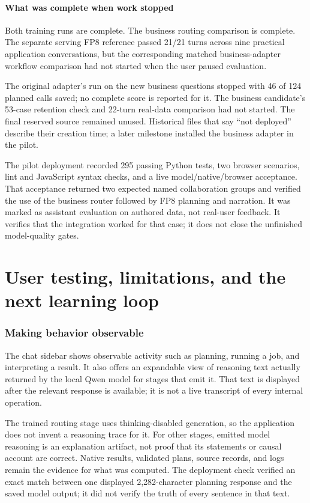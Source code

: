 \documentclass[11pt,a4paper]{article}
\begin{document}
\subsection{What was complete when work stopped}

Both training runs are complete. The business routing comparison is complete.
The separate serving FP8 reference passed 21/21 turns across nine practical
application conversations, but the corresponding matched business-adapter
workflow comparison had not started when the user paused evaluation.

The original adapter's run on the new business questions stopped with 46 of 124
planned calls saved; no complete score is reported for it. The business
candidate's 53-case retention check and 22-turn real-data comparison had not
started. The final reserved source remained unused. Historical files that say
``not deployed'' describe their creation time; a later milestone installed the
business adapter in the pilot.~\cite{stoprecord,deployment}

The pilot deployment recorded 295 passing Python tests, two browser scenarios,
lint and JavaScript syntax checks, and a live model/native/browser acceptance.
That acceptance returned two expected named collaboration groups and verified
the use of the business router followed by FP8 planning and narration. It was
marked as assistant evaluation on authored data, not real-user feedback.
It verifies that the integration worked for that case; it does not close the
unfinished model-quality gates.

\part{User testing, limitations, and the next learning loop}

\section{Making behavior observable}

The chat sidebar shows observable activity such as planning, running a job,
and interpreting a result. It also offers an expandable view of reasoning text
actually returned by the local Qwen model for stages that emit it. That text is
displayed after the relevant response is available; it is not a live transcript
of every internal operation.

The trained routing stage uses thinking-disabled generation, so the application
does not invent a reasoning trace for it. For other stages, emitted model
reasoning is an explanation artifact, not proof that its statements or causal
account are correct. Native results, validated plans, source records, and logs
remain the evidence for what was computed. The deployment check verified an
exact match between one displayed 2,282-character planning response and the
saved model output; it did not verify the truth of every sentence in that text.
\end{document}
